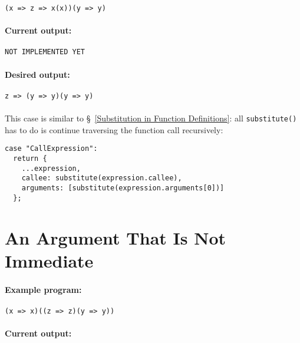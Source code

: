 \documentclass[12pt, oneside]{book}
\begin{document}
\begin{verbatim}
(x => z => x(x))(y => y)
\end{verbatim}

\paragraph{Current output:}

\begin{verbatim}
NOT IMPLEMENTED YET
\end{verbatim}

\paragraph{Desired output:}

\begin{verbatim}
z => (y => y)(y => y)
\end{verbatim}

\paragraph{}

This case is similar to §~\ref{Substitution in Function Definitions}: all \texttt{substitute()} has to do is continue traversing the function call recursively:

\begin{verbatim}
case "CallExpression":
  return {
    ...expression,
    callee: substitute(expression.callee),
    arguments: [substitute(expression.arguments[0])]
  };
\end{verbatim}

\section{An Argument That Is Not Immediate}
\label{An Argument That Is Not Immediate}

\paragraph{Example program:}

\begin{verbatim}
(x => x)((z => z)(y => y))
\end{verbatim}

\paragraph{Current output:}
\end{document}
